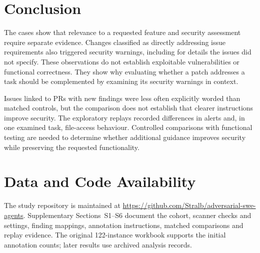 \documentclass[acmsmall,screen,nonacm]{acmart}
\begin{document}
\section{Conclusion}

The cases show that relevance to a requested feature and security assessment require separate evidence. Changes classified as directly addressing issue requirements also triggered security warnings, including for details the issues did not specify. These observations do not establish exploitable vulnerabilities or functional correctness. They show why evaluating whether a patch addresses a task should be complemented by examining its security warnings in context.

Issues linked to PRs with new findings were less often explicitly worded than matched controls, but the comparison does not establish that clearer instructions improve security. The exploratory replays recorded differences in alerts and, in one examined task, file-access behaviour. Controlled comparisons with functional testing are needed to determine whether additional guidance improves security while preserving the requested functionality.

\section*{Data and Code Availability}

The study repository is maintained at \url{https://github.com/Stralb/adversarial-swe-agents}. Supplementary Sections~S1--S6 document the cohort, scanner checks and settings, finding mappings, annotation instructions, matched comparisons and replay evidence. The original 122-instance workbook supports the initial annotation counts; later results use archived analysis records.
\end{document}
